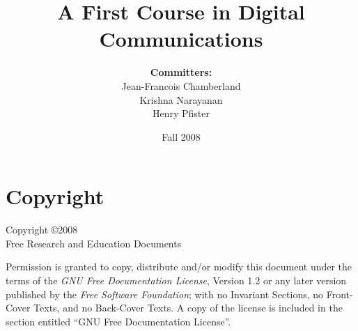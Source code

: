 \documentclass[12pt,openany]{book}
\begin{document}
\frontmatter

\author{
\textbf{Committers:} \\
Jean-Francois Chamberland \\
Krishna Narayanan \\
Henry Pfister}

\title{A First Course in Digital Communications}

\date{Fall 2008}

\maketitle

\chapter*{Copyright}
Copyright \copyright 2008 \\
Free Research and Education Documents

Permission is granted to copy, distribute and/or modify this document under the terms of the \emph{GNU Free Documentation License}, Version 1.2 or any later version published by the \emph{Free Software Foundation}; with no Invariant Sections, no Front-Cover Texts, and no Back-Cover Texts.
A copy of the license is included in the section entitled ``GNU Free Documentation License''.

\tableofcontents



\mainmatter





%


\appendix



%
\end{document}
